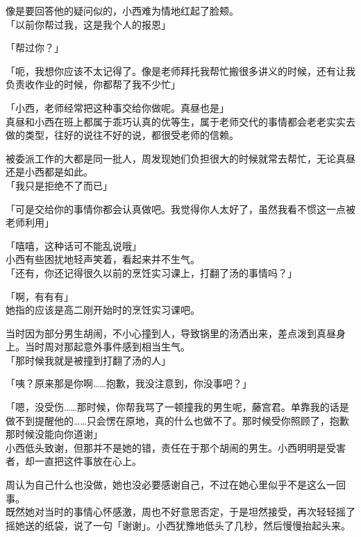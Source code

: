像是要回答他的疑问似的，小西难为情地红起了脸颊。\\

「以前你帮过我，这是我个人的报恩」

「帮过你？」

「呃，我想你应该不太记得了。像是老师拜托我帮忙搬很多讲义的时候，还有让我负责收作业的时候，你都帮了我不少忙」

「小西，老师经常把这种事交给你做呢。真昼也是」\\

真昼和小西在班上都属于乖巧认真的优等生，属于老师交代的事情都会老老实实去做的类型，往好的说往不好的说，都很受老师的信赖。

被委派工作的大都是同一批人，周发现她们负担很大的时候就常去帮忙，无论真昼还是小西都是如此。\\


「我只是拒绝不了而已」

「可是交给你的事情你都会认真做吧。我觉得你人太好了，虽然我看不惯这一点被老师利用」

「嘻嘻，这种话可不能乱说哦」\\

小西有些困扰地轻声笑着，看起来并不生气。\\

「还有，你还记得很久以前的烹饪实习课上，打翻了汤的事情吗？」

「啊，有有有」\\

她指的应该是高二刚开始时的烹饪实习课吧。

当时因为部分男生胡闹，不小心撞到人，导致锅里的汤洒出来，差点泼到真昼身上。当时周对那起意外事件感到相当生气。\\

「那时候我就是被撞到打翻了汤的人」

「咦？原来那是你啊……抱歉，我没注意到，你没事吧？」

「嗯，没受伤……那时候，你帮我骂了一顿撞我的男生呢，藤宫君。单靠我的话是做不到提醒他的……只会愣在原地，真的什么也做不了。那时候受你照顾了，抱歉那时候没能向你道谢」\\

小西低头致谢，但那并不是她的错，责任在于那个胡闹的男生。小西明明是受害者，却一直把这件事放在心上。

周认为自己什么也没做，她也没必要感谢自己，不过在她心里似乎不是这么一回事。\\

既然她对当时的事情心怀感激，周也不好意思否定，于是坦然接受，再次轻轻摇了摇她送的纸袋，说了一句「谢谢」。小西犹豫地低头了几秒，然后慢慢抬起头来。\\

